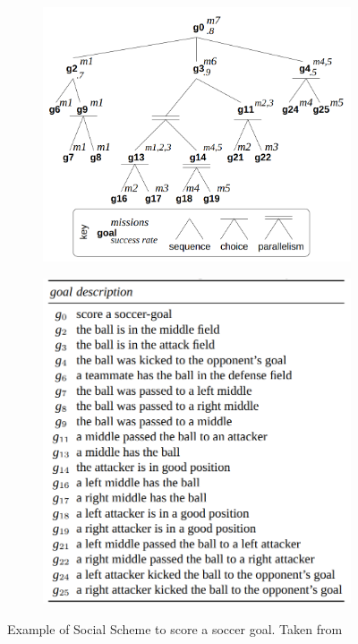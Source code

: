 \begin{figure}[!h]
    \centering
    \begin{subfigure}{.44\linewidth}
        \centering
        \includegraphics[width=\linewidth]{chapters/background/images/Moise - Social Scheme.png}
    \end{subfigure}
    \hfill
    \begin{subfigure}{.55\linewidth}
        \centering
        \includegraphics[width=0.8\linewidth]{chapters/background/images/Moise - Goals Descriptions.png}
    \end{subfigure}
    \caption{Example of Social Scheme to score a soccer goal. Taken from \cite{MOISEp}}
    \label{fig:moise_fs}
\end{figure}

